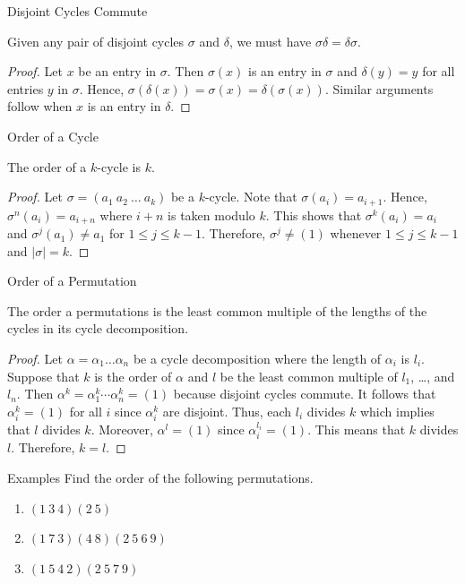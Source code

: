\documentclass{beamer}
\begin{document}
\begin{frame}{Disjoint Cycles Commute}
\begin{theorem}
Given any pair of disjoint cycles $\sigma$ and $\delta$, we must have $\sigma\delta = \delta\sigma$.
\end{theorem}    
\pause
\begin{proof}
\justifying
Let $x$ be an entry in $\sigma$. Then $\sigma(x)$ is an entry in $\sigma$ and $\delta(y) = y$ for all entries $y$ in $\sigma$. Hence, $\sigma(\delta(x)) = \sigma(x) = \delta(\sigma(x))$. Similar arguments follow when $x$ is an entry in $\delta$.
\end{proof}
\end{frame}

\begin{frame}{Order of a Cycle}
\begin{lemma}
The order of a $k$-cycle is $k$. 
\end{lemma}
\pause
\begin{proof}
Let $\sigma = (a_1 \ a_2 \ \dots \ a_k)$ be a $k$-cycle. Note that $\sigma(a_i) = a_{i + 1}$. Hence, $\sigma^n(a_i) = a_{i + n}$ where $i + n$ is taken modulo $k$. This shows that $\sigma^k(a_i) = a_i$ and $\sigma^j(a_1) \neq a_1$ for $1 \leq j \leq k-1$. Therefore, $\sigma^j \neq (1)$ whenever $1 \leq j \leq k -1$ and $|\sigma| = k$.
\end{proof}
\end{frame}

\begin{frame}{Order of a Permutation}
\begin{theorem}
\justifying
The order a permutations is the least common multiple of the lengths of the cycles in its cycle decomposition.    
\end{theorem}
\pause
\begin{proof}
\justifying
Let $\alpha = \alpha_1\dots\alpha_n$ be a cycle decomposition where the length of $\alpha_i$ is $l_i$. Suppose that $k$ is the order of $\alpha$ and $l$ be the least common multiple of $l_1$, \dots, and $l_n$. Then $\alpha^k = \alpha_1^k\cdots\alpha_n^k = (1)$ because disjoint cycles commute. It follows that $\alpha_i^k = (1)$ for all $i$ since $\alpha_i^k$ are disjoint. Thus, each $l_i$ divides $k$ which implies that $l$ divides $k$. Moreover, $\alpha^l = (1)$ since $\alpha_i^{l_i} = (1)$. This means that $k$ divides $l$. Therefore, $k = l$.
\end{proof}
\end{frame}

\begin{frame}{Examples}
Find the order of the following permutations.
\begin{enumerate}
    \item $(1 \ 3 \ 4)(2 \ 5)$
    \item $(1 \ 7 \ 3)(4 \ 8)(2 \ 5 \ 6 \ 9)$
    \item $(1 \ 5 \ 4 \ 2)(2 \ 5 \ 7 \ 9)$
\end{enumerate}
\end{frame}
\end{document}
